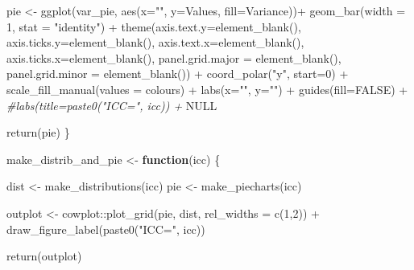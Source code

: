 \documentclass[
]{article}
\newenvironment{Shaded}{\begin{snugshade}}{\end{snugshade}}
\newcommand{\AttributeTok}[1]{\textcolor[rgb]{0.77,0.63,0.00}{#1}}
\newcommand{\CommentTok}[1]{\textcolor[rgb]{0.56,0.35,0.01}{\textit{#1}}}
\newcommand{\ConstantTok}[1]{\textcolor[rgb]{0.00,0.00,0.00}{#1}}
\newcommand{\ControlFlowTok}[1]{\textcolor[rgb]{0.13,0.29,0.53}{\textbf{#1}}}
\newcommand{\DecValTok}[1]{\textcolor[rgb]{0.00,0.00,0.81}{#1}}
\newcommand{\FunctionTok}[1]{\textcolor[rgb]{0.00,0.00,0.00}{#1}}
\newcommand{\NormalTok}[1]{#1}
\newcommand{\OtherTok}[1]{\textcolor[rgb]{0.56,0.35,0.01}{#1}}
\newcommand{\SpecialCharTok}[1]{\textcolor[rgb]{0.00,0.00,0.00}{#1}}
\newcommand{\StringTok}[1]{\textcolor[rgb]{0.31,0.60,0.02}{#1}}
\begin{document}
\begin{Shaded}
\begin{Highlighting}[]
  
\NormalTok{  pie }\OtherTok{\textless{}{-}} \FunctionTok{ggplot}\NormalTok{(var\_pie, }\FunctionTok{aes}\NormalTok{(}\AttributeTok{x=}\StringTok{""}\NormalTok{, }\AttributeTok{y=}\NormalTok{Values, }\AttributeTok{fill=}\NormalTok{Variance))}\SpecialCharTok{+}
    \FunctionTok{geom\_bar}\NormalTok{(}\AttributeTok{width =} \DecValTok{1}\NormalTok{, }\AttributeTok{stat =} \StringTok{"identity"}\NormalTok{) }\SpecialCharTok{+}
    \FunctionTok{theme}\NormalTok{(}\AttributeTok{axis.text.y=}\FunctionTok{element\_blank}\NormalTok{(),}
          \AttributeTok{axis.ticks.y=}\FunctionTok{element\_blank}\NormalTok{(),}
          \AttributeTok{axis.text.x=}\FunctionTok{element\_blank}\NormalTok{(),}
          \AttributeTok{axis.ticks.x=}\FunctionTok{element\_blank}\NormalTok{(),}
          \AttributeTok{panel.grid.major =} \FunctionTok{element\_blank}\NormalTok{(), }
          \AttributeTok{panel.grid.minor =} \FunctionTok{element\_blank}\NormalTok{()) }\SpecialCharTok{+}
    \FunctionTok{coord\_polar}\NormalTok{(}\StringTok{"y"}\NormalTok{, }\AttributeTok{start=}\DecValTok{0}\NormalTok{) }\SpecialCharTok{+}
    \FunctionTok{scale\_fill\_manual}\NormalTok{(}\AttributeTok{values =}\NormalTok{ colours) }\SpecialCharTok{+}
    \FunctionTok{labs}\NormalTok{(}\AttributeTok{x=}\StringTok{""}\NormalTok{, }\AttributeTok{y=}\StringTok{""}\NormalTok{) }\SpecialCharTok{+}
    \FunctionTok{guides}\NormalTok{(}\AttributeTok{fill=}\ConstantTok{FALSE}\NormalTok{) }\SpecialCharTok{+}
    \CommentTok{\#labs(title=paste0("ICC=", icc)) +}
    \ConstantTok{NULL}
    
  
  \FunctionTok{return}\NormalTok{(pie)}
\NormalTok{\}}

\NormalTok{make\_distrib\_and\_pie }\OtherTok{\textless{}{-}} \ControlFlowTok{function}\NormalTok{(icc) \{}
  
\NormalTok{  dist }\OtherTok{\textless{}{-}} \FunctionTok{make\_distributions}\NormalTok{(icc)}
\NormalTok{  pie }\OtherTok{\textless{}{-}} \FunctionTok{make\_piecharts}\NormalTok{(icc)}
  
\NormalTok{  outplot }\OtherTok{\textless{}{-}}\NormalTok{ cowplot}\SpecialCharTok{::}\FunctionTok{plot\_grid}\NormalTok{(pie, dist, }\AttributeTok{rel\_widths =} \FunctionTok{c}\NormalTok{(}\DecValTok{1}\NormalTok{,}\DecValTok{2}\NormalTok{)) }\SpecialCharTok{+}
    \FunctionTok{draw\_figure\_label}\NormalTok{(}\FunctionTok{paste0}\NormalTok{(}\StringTok{"ICC="}\NormalTok{, icc))}
  
  \FunctionTok{return}\NormalTok{(outplot)}
  

\end{Highlighting}
\end{Shaded}
\end{document}
